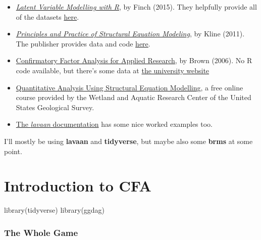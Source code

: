 \documentclass[
  letterpaper,
  DIV=11,
  numbers=noendperiod]{scrreprt}
\newenvironment{Shaded}{\begin{snugshade}}{\end{snugshade}}
\newcommand{\FunctionTok}[1]{\textcolor[rgb]{0.28,0.35,0.67}{#1}}
\newcommand{\NormalTok}[1]{\textcolor[rgb]{0.00,0.23,0.31}{#1}}
\begin{document}
\begin{itemize}
\item
  \href{https://www.routledge.com/Latent-Variable-Modeling-with-R/Finch-French/p/book/9780415832458}{\emph{Latent
  Variable Modelling with R}}, by Finch (2015). They helpfully provide
  all of the datasets
  \href{https://www.routledge.com/Latent-Variable-Modeling-with-R/Finch-French/p/book/9780415832458}{here}.
\item
  \href{https://www.guilford.com/books/Principles-and-Practice-of-Structural-Equation-Modeling/Rex-Kline/9781462523344}{\emph{Principles
  and Practice of Structural Equation Modeling}}, by Kline (2011). The
  publisher provides data and code
  \href{https://www.guilford.com/companion-site/Principles-and-Practice-of-Structural-Equation-Modeling-Fourth-Edition/9781462523344}{here}.
\item
  \href{http://www.kharazmi-statistics.ir/Uploads/Public/book/Methodology\%20in\%20the\%20Social\%20Sciences.pdf}{Confirmatory
  Factor Analysis for Applied Research}, by Brown (2006). No R code
  available, but there's some data at
  \href{https://people.bu.edu/tabrown/cfabook.html}{the university
  website}
\item
  \href{https://www.usgs.gov/centers/wetland-and-aquatic-research-center/science/quantitative-analysis-using-structural-equation}{Quantitative
  Analysis Using Structural Equation Modelling}, a free online course
  provided by the Wetland and Aquatic Research Center of the United
  States Geological Survey.
\item
  \href{https://www.lavaan.ugent.be/tutorial/index.html}{The
  \emph{lavaan} documentation} has some nice worked examples too.
\end{itemize}

I'll mostly be using \textbf{lavaan} and \textbf{tidyverse}, but maybe
also some \textbf{brms} at some point.

\part{Introduction to CFA}

\begin{Shaded}
\begin{Highlighting}[]
\FunctionTok{library}\NormalTok{(tidyverse)}
\FunctionTok{library}\NormalTok{(ggdag)}
\end{Highlighting}
\end{Shaded}

\hypertarget{the-whole-game}{%
\section*{The Whole Game}\label{the-whole-game}}
\end{document}
